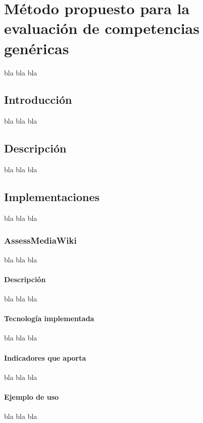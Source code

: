 \section{Método propuesto para la evaluación de competencias genéricas}

bla bla bla

\subsection{Introducción}

bla bla bla

\subsection{Descripción}

bla bla bla

\subsection{Implementaciones}

bla bla bla

\subsubsection{AssessMediaWiki}

bla bla bla

\paragraph*{Descripción}

bla bla bla

\paragraph*{Tecnología implementada}

bla bla bla

\paragraph*{Indicadores que aporta}

bla bla bla

\paragraph*{Ejemplo de uso}

bla bla bla

